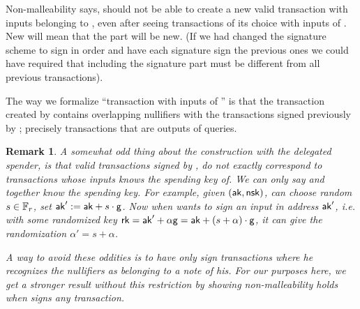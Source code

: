 \documentclass[11pt]{article}
\numberwithin{equation}{section} %
\numberwithin{figure}{section} %
\newtheorem{remark}[thm]{Remark}
\begin{document}
Non-malleability says, \adv should not be able to create a new valid transaction with inputs belonging to \oracle,
even after seeing transactions of its choice with inputs of \oracle. New will mean that the \rawtx part will be new.
(If we had changed the signature scheme to sign in order and have each signature sign the previous ones we could have required that
\tx including the signature part must be different from all previous transactions).

The way we formalize ``transaction with inputs of \oracle'' is that the transaction created by \adv contains 
overlapping nullifiers with the transactions signed previously by \oracle; precisely transactions that are outputs of \signallinputs queries.

\begin{remark}\label{rem:weirdstuff}
 A somewhat odd thing about the construction with the delegated spender, is that valid transactions signed by \oracle, do not exactly correspond to transactions whose inputs \oracle knows the spending key of. We can only say \oracle and \adv \emph{together} know the spending key.
 For example, given $(\mathsf{ak},\mathsf{nsk})$, \adv can choose random $s\in {\mathbb F}_r$, set $\mathsf{ak}' := \mathsf{ak} + s\cdot \mathsf{g}$.   
 Now when \adv wants to sign an input in address $\mathsf{ak}'$, i.e. with some randomized key $\mathsf{rk} = \mathsf{ak}'+ \alpha \mathsf{g}  = \mathsf{ak} + (s+\alpha)\cdot \mathsf{g}$,
 it can give \oracle the randomization $\alpha' = s+\alpha$.
 
 A way to avoid these oddities is to have \oracle only sign transactions where he recognizes the nullifiers as belonging to a note of his.
 For our purposes here, we get a stronger result without this restriction by showing non-malleability holds when \oracle signs \emph{any} transaction.
\end{remark}
\end{document}
